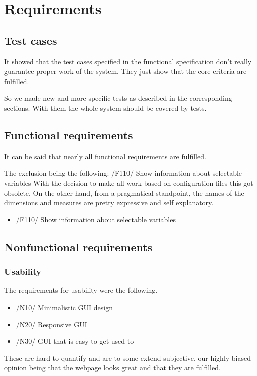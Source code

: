 \section{Requirements}\label{spec}


\subsection{Test cases}
It showed that the test cases specified in the functional specification
don't really guarantee proper work of the system. They just show
that the core criteria are fulfilled. 

So we made new and more specific tests as described in the
corresponding sections. With them the whole system should be covered by tests.

\subsection{Functional requirements}
It can be said that nearly all functional requirements are fulfilled. 

The exclusion being the following: /F110/ Show information about selectable variables
With the decision to make all work based on configuration files this got obsolete.%
On the other hand, from a pragmatical standpoint, the names of the dimensions
and measures are pretty expressive and self explanatory. %
\begin{itemize}
  \item /F110/ Show information about selectable variables
\end{itemize}

\subsection{Nonfunctional requirements}
\subsubsection{Usability}
The requirements for usability were the following. 
\begin{itemize}
  \item /N10/ Minimalistic GUI design
  \item /N20/ Responsive GUI
  \item /N30/ GUI that is easy to get used to
\end{itemize}
These are hard to quantify and are to some extend subjective, 
our highly biased opinion being that the webpage looks great and that they are fulfilled.

